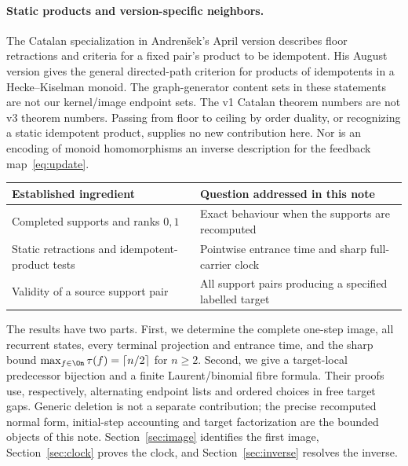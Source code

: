 \paragraph{Static products and version-specific neighbors.}
The Catalan specialization in Andren\v{s}ek's April version
\cite[Section 4, Proposition 4.1, Theorem 4.4 and Lemma 4.6]{andrensek2026endomorphismsv1}
describes floor retractions and criteria for a fixed pair's product to be
idempotent. His August version
\cite[Theorem 3.6]{andrensek2026homomorphismsv3} gives the general
directed-path criterion for products of idempotents in a
Hecke--Kiselman monoid. The graph-generator content sets in these
statements are not our kernel/image endpoint sets. The v1 Catalan theorem
numbers are not v3 theorem numbers. Passing from floor to ceiling by
order duality, or recognizing a static idempotent product, supplies no
new contribution here. Nor is an encoding of monoid homomorphisms an
inverse description for the feedback map~\eqref{eq:update}.

\begin{center}
\small
\begin{tabular}{p{}p{}}
\toprule
Established ingredient & Question addressed in this note \\
\midrule
Completed supports and ranks $0,1$ & Exact behaviour when the supports are recomputed \\
Static retractions and idempotent-product tests & Pointwise entrance time and sharp full-carrier clock \\
Validity of a source support pair & All support pairs producing a specified labelled target \\
\bottomrule
\end{tabular}
\end{center}

The results have two parts. First, we determine the complete one-step
image, all recurrent states, every terminal projection and entrance time,
and the sharp bound $\max_{f\in\On}\tau(f)=\lceil n/2\rceil$ for
$n\ge2$. Second, we give a target-local predecessor bijection and a
finite Laurent/binomial fibre formula. Their proofs use, respectively,
alternating endpoint lists and ordered choices in free target gaps.
Generic deletion is not a separate contribution; the precise recomputed
normal form, initial-step accounting and target factorization are the
bounded objects of this note. Section~\ref{sec:image} identifies the first
image, Section~\ref{sec:clock} proves the clock, and
Section~\ref{sec:inverse} resolves the inverse.
